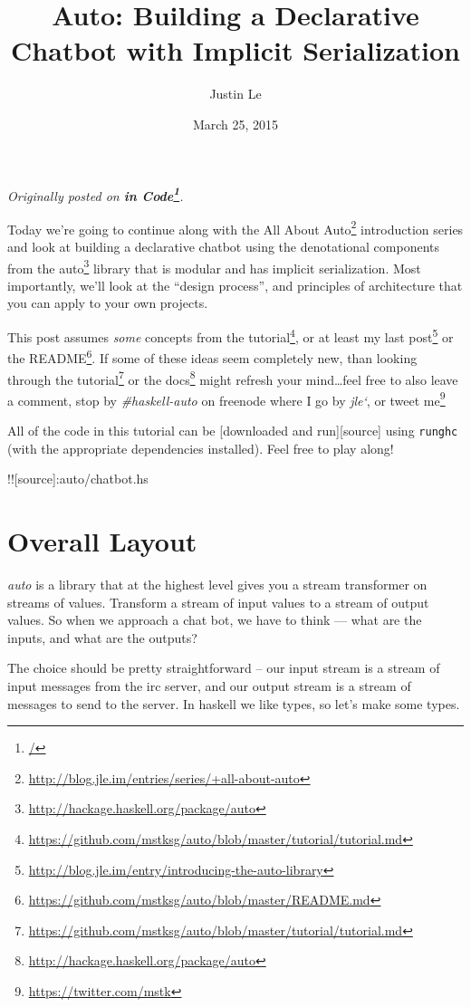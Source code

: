 \documentclass[]{article}
\title{Auto: Building a Declarative Chatbot with Implicit Serialization}
\author{Justin Le}
\date{March 25, 2015}
\renewcommand{\href}[2]{#2\footnote{\url{#1}}}
\begin{document}
\maketitle

\emph{Originally posted on \textbf{\href{/}{in Code}}.}

Today we're going to continue along with the
\href{http://blog.jle.im/entries/series/+all-about-auto}{All About Auto}
introduction series and look at building a declarative chatbot using the
denotational components from the
\href{http://hackage.haskell.org/package/auto}{auto} library that is
modular and has implicit serialization. Most importantly, we'll look at
the ``design process'', and principles of architecture that you can
apply to your own projects.

This post assumes \emph{some} concepts from the
\href{https://github.com/mstksg/auto/blob/master/tutorial/tutorial.md}{tutorial},
or at least my
\href{http://blog.jle.im/entry/introducing-the-auto-library}{last post}
or the
\href{https://github.com/mstksg/auto/blob/master/README.md}{README}. If
some of these ideas seem completely new, than looking through the
\href{https://github.com/mstksg/auto/blob/master/tutorial/tutorial.md}{tutorial}
or the \href{http://hackage.haskell.org/package/auto}{docs} might
refresh your mind\ldots{}feel free to also leave a comment, stop by
\emph{\#haskell-auto} on freenode where I go by \emph{jle`}, or
\href{https://twitter.com/mstk}{tweet me}

All of the code in this tutorial can be {[}downloaded and
run{]}{[}source{]} using \texttt{runghc} (with the appropriate
dependencies installed). Feel free to play along!

!!{[}source{]}:auto/chatbot.hs

\section{Overall Layout}\label{overall-layout}

\emph{auto} is a library that at the highest level gives you a stream
transformer on streams of values. Transform a stream of input values to
a stream of output values. So when we approach a chat bot, we have to
think --- what are the inputs, and what are the outputs?

The choice should be pretty straightforward -- our input stream is a
stream of input messages from the irc server, and our output stream is a
stream of messages to send to the server. In haskell we like types, so
let's make some types.
\end{document}
